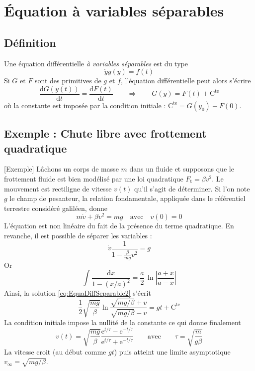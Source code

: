  
\section{Équation à variables séparables}

\subsection{Définition}

Une équation  différentielle \emph{à variables séparables} est du type 
\begin{equation}
	\dot{y}g(y)=f(t)\label{eq:EquaDiffSeparabe}
\end{equation}
Si $G$ et $F$ sont des primitives de $g$ et $f$, l'équation différentielle peut alors s'écrire 
\begin{equation}
	\frac{\mathrm{d} G(y(t))}{\mathrm{d} t}=\frac{\mathrm{d} F(t)}{\mathrm{d} t}
	\qquad\Longrightarrow\qquad G(y)=F(t)+\mathrm{C^{te}}\label{eq:EquaDiffSeparable2}
\end{equation}
où la constante  est imposée par la condition initiale : $\mathrm{C^{te}}=G(y_{0})-F(0)$.

\subsection{Exemple : Chute libre avec frottement quadratique}[Exemple]
Lâchons un corps de masse $m$ dans un fluide et supposons que le frottement fluide est bien modélisé par une loi quadratique  $F_\text{t}=\beta v^{2}$. Le mouvement est rectiligne de vitesse $v(t)$ qu'il s'agit de déterminer. Si l'on note $g$ le champ de pesanteur, la relation fondamentale, appliquée dans le référentiel terrestre considéré galiléen, donne
\[
m\dot{v}+\beta v^{2}=mg \quad \text{avec}\quad v(0)  =  0
\]
L'équation est non linéaire du fait de la présence du terme quadratique. En revanche, il est possible de séparer les variables :
\[
\dot{v}\frac{1}{1-\frac{\beta}{mg}v^{2}}=g
\]
Or 
	\[	
	\int\frac{\mathrm{d}x}{1-(x/a)^{2}}=\frac{a}{2}\,\ln{\left|\frac{a+x}{a-x}\right|}
	\]
Ainsi, la solution \eqref{eq:EquaDiffSeparable2} s'écrit
	\[
	\frac{1}{2}\sqrt{\frac{mg}{\beta}}\ln\frac{\sqrt{mg/\beta}+v}{\sqrt{mg/\beta}-v}=gt+\mathrm{C^{te}}
	\]
La condition initiale impose la nullité de la constante ce qui donne finalement
\[
v(t)=\sqrt{\frac{mg}{\beta}}\frac{\mathrm{e}^{t/\tau}-\mathrm{e}^{-t/\tau}}{\mathrm{e}^{t/\tau}+\mathrm{e}^{-t/\tau}}
\qquad\text{avec}\qquad
\tau=\sqrt{\frac{m}{g\beta}}
\]
La vitesse croit (au début comme $gt$) puis atteint une limite asymptotique $v_{\infty}=\sqrt{mg/\beta}$.


